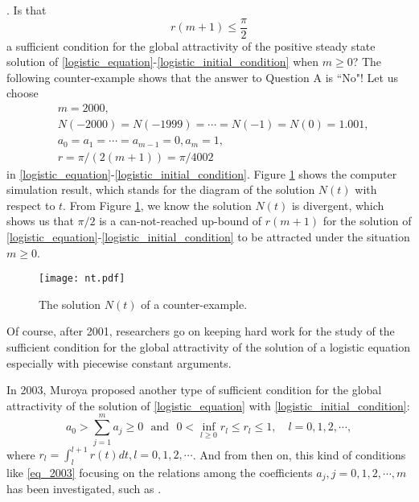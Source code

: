\documentclass{HZNUMCM}
\begin{document}
 \vskip 0.2cm.{
{ Is that $$r(m+1)\leqslant{\frac{\pi}{2}}
$$ a sufficient condition  for the global attractivity of the positive steady state solution of \eqref{logistic_equation}-\eqref{logistic_initial_condition} when $m\geqslant0$?}
}
 \vskip 0.2cm
 The following counter-example shows that the answer to Question A is ``No"!  Let us choose
\begin{align*}
&m=2000,\\
&N(-2000)=N(-1999)=\cdots=N(-1)=N(0)=1.001,\\
&a_0=a_1=\cdots=a_{m-1}=0,a_m=1,\\
&r=\pi/(2(m+1))=\pi/4002
\end{align*}in  \eqref{logistic_equation}-\eqref{logistic_initial_condition}.  Figure \ref{fig0} shows the computer simulation result, which stands for the diagram of the solution $N(t)$ with respect to $t$. From Figure \ref{fig0}, we know the solution $N(t)$ is divergent, which shows us that $\pi/2$ is a can-not-reached up-bound of $r(m+1)$ for the solution of \eqref{logistic_equation}-\eqref{logistic_initial_condition} to be attracted under the situation $m\geqslant 0$.
\begin{figure}[htbp]
\begin{center}
 \texttt{[image: nt.pdf]}
 \caption{The solution $N(t)$ of a counter-example. }\label{fig0}
 \end{center}
\end{figure}

Of course, after 2001,  researchers go on  keeping hard work for the study of the sufficient condition for the global attractivity of the solution of a logistic equation especially with piecewise constant arguments.

In 2003, Muroya \cite{2003_muroya_MR1962027} proposed  another type of sufficient condition for the global attractivity  of the solution of \eqref{logistic_equation} with \eqref{logistic_initial_condition}:
\begin{equation}\label{eq_2003}
a_0>\sum_{j=1}^ma_j\geqslant0\text{~~and~~}0<\inf_{l\geqslant0}r_l\leqslant r_l\leqslant 1,\quad l=0,1,2,\cdots,
\end{equation}
where $r_l=\int_l^{l+1}r(t)dt,l=0,1,2,\cdots$.
And from then on, this kind of conditions like \eqref{eq_2003} focusing on the relations among the coefficients  $a_j,j=0,1,2,\cdots,m$ has been investigated, such as  \cite{2009_li_R2451705,2008_muroya_MR2428273,2009_muroya_MR2481600,2010_nakata_MR2680013,2011_Ozturk_1532,2005_uesugi_MR2061343}.
\end{document}
